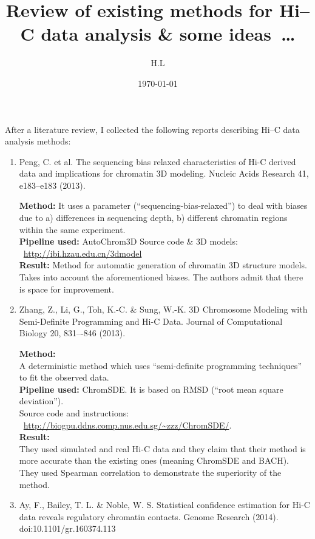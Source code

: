 \documentclass[a4paper,12pt]{article}
\title{Review of existing methods for Hi--C data analysis \& some ideas~\ldots}
\author{H.L}
\date{\today}
\begin{document}
\maketitle

After a literature review, I collected the following reports 
describing Hi--C data analysis methods:
	
\begin{enumerate}
	\item Peng, C. et al. The sequencing bias relaxed characteristics of Hi-C derived data and implications for chromatin 3D modeling. Nucleic Acids Research 41, e183–e183 (2013).
    
    \textbf{Method:} It uses a parameter (``sequencing-bias-relaxed'') to deal with biases due to a) differences in sequencing depth, b) different chromatin regions within the same experiment.\\
	\textbf{Pipeline used:} AutoChrom3D
							Source code \& 3D models: ~\url{http://ibi.hzau.edu.cn/3dmodel} \\
	\textbf{Result:} Method for automatic generation of chromatin 3D structure models. Takes into account the aforementioned biases. The authors admit that there is space for improvement.

	\item Zhang, Z., Li, G., Toh, K.-C. \& Sung, W.-K. 3D Chromosome Modeling with Semi-Definite Programming and Hi-C Data. Journal of Computational Biology 20, 831–-846 (2013).
    
    \textbf{Method:}\\ A deterministic method which uses ``semi-definite programming techniques'' to fit the observed data.\\
	\textbf{Pipeline used:} ChromSDE. It is based on RMSD (``root mean square deviation'').\\
    Source code and instructions: ~\url{http://biogpu.ddns.comp.nus.edu.sg/~zzz/ChromSDE/}.\\
	\textbf{Result:}\\ They used simulated and real Hi-C data and they claim
	that their method is more accurate than the existing ones (meaning ChromSDE
	and BACH). Τhey used Spearman correlation to demonstrate the superiority of the method.

	\item Ay, F., Bailey, T. L. \& Noble, W. S. Statistical confidence estimation for Hi-C data reveals regulatory chromatin contacts. Genome Research (2014). doi:10.1101/gr.160374.113


\end{enumerate}
\end{document}
